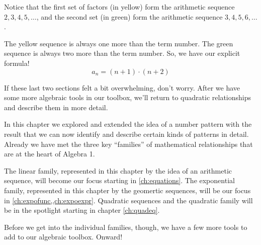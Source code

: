 \begin{boxex}
Notice that the first set of factors (in yellow) form the arithmetic sequence $2, 3, 4, 5, \dotsc$, and the second set (in green) form the arithmetic sequence $3, 4, 5, 6, \dotsc$.

The yellow sequence is always one more than the term number. The green sequence is always two more than the term number. So, we have our explicit formula! \[a_n = (n+1)\cdot(n+2)\]
\end{boxex}

If these last two sections felt a bit overwhelming, don't worry. After we have some more algebraic tools in our toolbox, we'll return to quadratic relationships and describe them in more detail.


\chaptersummary

In this chapter we explored and extended the idea of a number pattern with the result that we can now identify and describe certain kinds of patterns in detail. Already we have met the three key ``families'' of mathematical relationships that are at the heart of Algebra 1.

The linear family, represented in this chapter by the idea of an arithmetic sequence, will become our focus starting in \cref{ch:equations}. The exponential family, represented in this chapter by the geomertic sequences, will be our focus in \cref{ch:expofunc,,ch:expoexpr}. Quadratic sequences and the quadratic family will be in the spotlight starting in chapter \cref{ch:quadeq}.

Before we get into the individual families, though, we have a few more tools to add to our algebraic toolbox. Onward!
